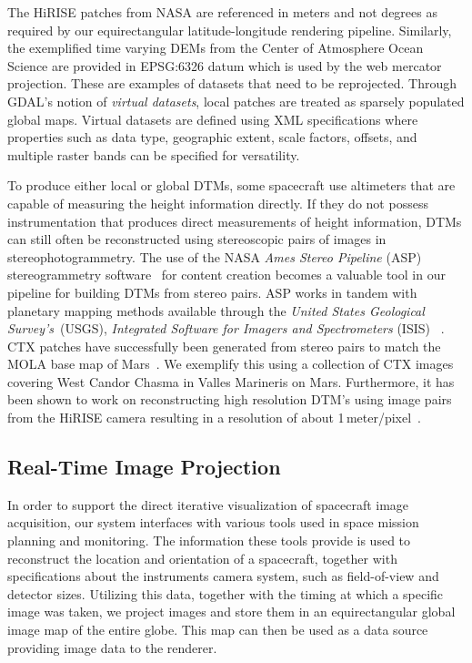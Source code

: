 \documentclass[journal]{vgtc}                %
\begin{document}
The HiRISE patches from NASA are referenced in meters and not degrees as required by our equirectangular latitude-longitude rendering pipeline.
Similarly, the exemplified time varying DEMs from the Center of Atmosphere Ocean Science are provided in EPSG:6326 datum which is used by the web mercator projection.
These are examples of datasets that need to be reprojected.
Through GDAL's notion of \emph{virtual datasets}, local patches are treated as sparsely populated global maps. Virtual datasets are defined using XML specifications where properties such as data type, geographic extent, scale factors, offsets, and multiple raster bands can be specified for versatility.

To produce either local or global DTMs, some spacecraft use altimeters that are capable of measuring the height information directly.
If they do not possess instrumentation that produces direct measurements of height information, DTMs can still often be reconstructed using stereoscopic pairs of images in stereophotogrammetry.
The use of the NASA \emph{Ames Stereo Pipeline} (ASP) stereogrammetry software~\cite{moratto2010ames} for content creation becomes a valuable tool in our pipeline for building DTMs from stereo pairs.
ASP works in tandem with planetary mapping methods available through the \emph{United States Geological Survey's}~(USGS), \emph{Integrated Software for Imagers and Spectrometers} (ISIS) ~\cite{gaddis1997overview}.
CTX patches have successfully been generated from stereo pairs to match the MOLA base map of Mars~\cite{broxton2008ames, mayer2016integrated}. We exemplify this using a collection of CTX images covering West Candor Chasma in Valles Marineris on Mars.
Furthermore, it has been shown to work on reconstructing high resolution DTM's using image pairs from the HiRISE camera resulting in a resolution of about 1\,meter/pixel~\cite{li2011rigorous}.

\subsection{Real-Time Image Projection} \label{sec:imageprojection}
In order to support the direct iterative visualization of spacecraft image acquisition, our system interfaces with various tools used in space mission planning and monitoring.
The information these tools provide is used to reconstruct the location and orientation of a spacecraft, together with specifications about the instruments camera system, such as field-of-view and detector sizes.
Utilizing this data, together with the timing at which a specific image was taken, we project images and store them in an equirectangular global image map of the entire globe. This map can then be used as a data source providing image data to the renderer.
\end{document}
